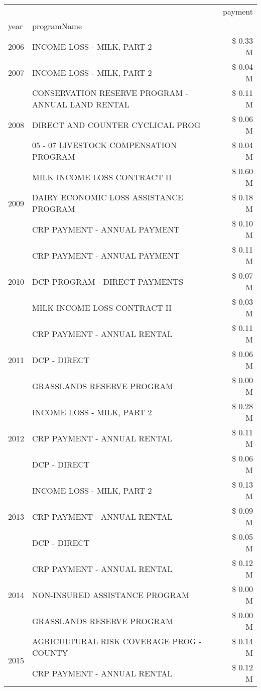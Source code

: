 \begin{tabular}{llr}
\toprule
 &  & payment \\
year & programName &  \\
\midrule
2006 & INCOME LOSS - MILK, PART 2 & \$ 0.33 M \\
\cline{1-3}
2007 & INCOME LOSS - MILK, PART 2 & \$ 0.04 M \\
\cline{1-3}
\multirow[t]{3}{*}{2008} & CONSERVATION RESERVE PROGRAM - ANNUAL LAND RENTAL & \$ 0.11 M \\
 & DIRECT AND COUNTER CYCLICAL PROG & \$ 0.06 M \\
 & 05 - 07 LIVESTOCK COMPENSATION PROGRAM & \$ 0.04 M \\
\cline{1-3}
\multirow[t]{3}{*}{2009} & MILK INCOME LOSS CONTRACT II & \$ 0.60 M \\
 & DAIRY ECONOMIC LOSS ASSISTANCE PROGRAM & \$ 0.18 M \\
 & CRP PAYMENT - ANNUAL PAYMENT & \$ 0.10 M \\
\cline{1-3}
\multirow[t]{3}{*}{2010} & CRP PAYMENT - ANNUAL PAYMENT & \$ 0.11 M \\
 & DCP PROGRAM - DIRECT PAYMENTS & \$ 0.07 M \\
 & MILK INCOME LOSS CONTRACT II & \$ 0.03 M \\
\cline{1-3}
\multirow[t]{3}{*}{2011} & CRP PAYMENT - ANNUAL RENTAL & \$ 0.11 M \\
 & DCP - DIRECT & \$ 0.06 M \\
 & GRASSLANDS RESERVE PROGRAM & \$ 0.00 M \\
\cline{1-3}
\multirow[t]{3}{*}{2012} & INCOME LOSS - MILK, PART 2 & \$ 0.28 M \\
 & CRP PAYMENT - ANNUAL RENTAL & \$ 0.11 M \\
 & DCP - DIRECT & \$ 0.06 M \\
\cline{1-3}
\multirow[t]{3}{*}{2013} & INCOME LOSS - MILK, PART 2 & \$ 0.13 M \\
 & CRP PAYMENT - ANNUAL RENTAL & \$ 0.09 M \\
 & DCP - DIRECT & \$ 0.05 M \\
\cline{1-3}
\multirow[t]{3}{*}{2014} & CRP PAYMENT - ANNUAL RENTAL & \$ 0.12 M \\
 & NON-INSURED ASSISTANCE PROGRAM & \$ 0.00 M \\
 & GRASSLANDS RESERVE PROGRAM & \$ 0.00 M \\
\cline{1-3}
\multirow[t]{3}{*}{2015} & AGRICULTURAL RISK COVERAGE PROG - COUNTY & \$ 0.14 M \\
 & CRP PAYMENT - ANNUAL RENTAL & \$ 0.12 M \\

\end{tabular}
